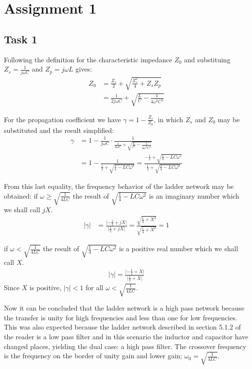 \documentclass[11pt,titlepage]{report}
\begin{document}
\chapter{Assignment 1}
\section{Task 1}

Following the definition for the characteristic impedance $Z_0$ and substituing $Z_s=\frac{1}{j\omega C}$ and $Z_p=j\omega L$ gives:
\begin{align}
Z_0 &=\frac{Z_s}{2} + \sqrt{\frac{Z_s^2}{4}+Z_sZ_p} \nonumber \\
&= \frac{1}{2j\omega C} + \sqrt{\frac{L}{C}-\frac{1}{4\omega^2C^2}} 
\end{align}

For the propagation coefficient we have $\gamma = 1-\frac{Z_s}{Z_0}$, in which $Z_s$ and $Z_0$ may be substituted and the result simplified:
\begin{align}
\gamma &= 1 - \frac{1}{j\omega C}\cdot\frac{1}{\frac{1}{2\omega C}+\sqrt{\frac{L}{C}-\frac{1}{4\omega^2C^2}}} \nonumber \\
&= 1 - \frac{1}{\frac{1}{2}+\sqrt{\frac{1}{4}-LC\omega^2}} = \frac{-\frac{1}{2}+\sqrt{\frac{1}{4}-LC\omega^2}}{\frac{1}{2}+\sqrt{\frac{1}{4}-LC\omega^2}}
\end{align}

From this last equality, the frequency behavior of the ladder network may be obtained:
if $\omega\geq\sqrt{\frac{1}{4LC}}$ the result of $\sqrt{\frac{1}{4}-LC\omega^2}$ is an imaginary number which we shall call $jX$.
\begin{align}
\lvert\gamma\rvert &= \frac{\lvert -\frac{1}{2}+jX \rvert}{\lvert \frac{1}{2}+jX \rvert} = \frac{\sqrt{\frac{1}{4}+X^2}}{\sqrt{\frac{1}{4}+X^2}}=1
\end{align}

if $\omega < \sqrt{\frac{1}{4LC}}$ the result of $\sqrt{\frac{1}{4}-LC\omega^2}$ is a positive real number which we shall call $X$.
\begin{eqnarray}
\lvert\gamma\rvert = \frac{\lvert -\frac{1}{2}+X \rvert}{\lvert \frac{1}{2}+X \rvert}
\end{eqnarray}
Since $X$ is positive, $\lvert\gamma\rvert < 1$ for all $\omega < \sqrt{\frac{1}{4LC}}$. 

Now it can be concluded that the ladder network is a high pass network because the transfer is unity for high frequencies and less than one for low frequencies. This was also expected because the ladder network described in section 5.1.2 of the reader is a low pass filter and in this scenario the inductor and capacitor have changed places, yielding the dual case: a high pass filter. The crossover frequency is the frequency on the border of unity gain and lower gain; $\omega_0=\sqrt{\frac{1}{4LC}}$.
\end{document}
